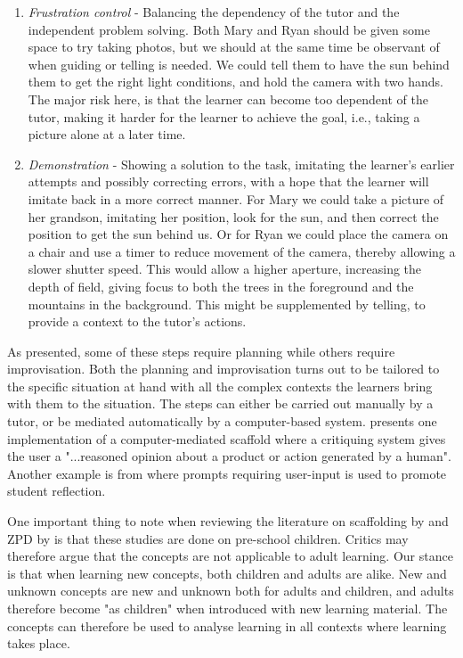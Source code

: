 \begin{enumerate}
\item{} \emph{Frustration control} - Balancing the dependency of the tutor and the independent problem solving. Both Mary and Ryan should be given some space to try taking photos, but we should at the same time be observant of when guiding or telling is needed. We could tell them to have the sun behind them to get the right light conditions, and hold the camera with two hands. The major risk here, is that the learner can become too dependent of the tutor, making it harder for the learner to achieve the goal, i.e., taking a picture alone at a later time.  

\item{}  \emph{Demonstration} - Showing a solution to the task, imitating the learner's earlier attempts and possibly correcting errors, with a hope that the learner will imitate back in a more correct manner. For Mary we could take a picture of her grandson, imitating her position, look for the sun, and then correct the position to get the sun behind us. Or for Ryan we could place the camera on a chair and use a timer to reduce movement of the camera, thereby allowing a slower shutter speed. This would allow a higher aperture, increasing the depth of field, giving focus to both the trees in the foreground and the mountains in the background. This might be supplemented by telling, to provide a context to the tutor's actions.
\end{enumerate}

As presented, some of these steps require planning while others require improvisation. Both the planning and improvisation turns out to be tailored to the specific situation at hand with all the complex contexts the learners bring with them to the situation. The steps can either be carried out manually by a tutor, or be mediated automatically by a computer-based system. \citet[p. 1]{fischer1991critics} presents one implementation of a computer-mediated scaffold where a critiquing system gives the user a "...reasoned opinion about a product or action generated by a human". Another example is from \citet{furberg2009socio} where prompts requiring user-input is used to promote student reflection. 

One important thing to note when reviewing the literature on scaffolding by \citet{wood1976role} and ZPD by \citet{vygotskiui1978mind} is that these studies are done on pre-school children. Critics may therefore argue that the concepts are not applicable to adult learning. Our stance is that when learning new concepts, both children and adults are alike. New and unknown concepts are new and unknown both for adults and children, and adults therefore become "as children" when introduced with new learning material. The concepts can therefore be used to analyse learning in all contexts where learning takes place. 

